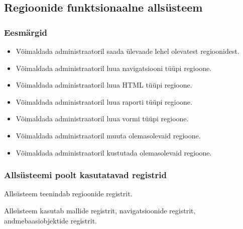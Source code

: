 \documentclass[a4paper,12pt]{article} %
\begin{document}
\subsection{Regioonide funktsionaalne allsüsteem}
\subsubsection{Eesmärgid}
\begin{itemize}
\item Võimaldada administraatoril saada ülevaade lehel olevatest regioonidest.
\item Võimaldada administraatoril luua navigatsiooni tüüpi regioone.
\item Võimaldada administraatoril luua HTML tüüpi regioone.
\item Võimaldada administraatoril luua raporti tüüpi regioone.
\item Võimaldada administraatoril luua vormi tüüpi regioone.
\item Võimaldada administraatoril muuta olemasolevaid regioone.
\item Võimaldada administraatoril kustutada olemasolevaid regioone.
\end{itemize}
\subsubsection{Allsüsteemi poolt kasutatavad registrid}
Allsüsteem teenindab regioonide registrit.\par
Allsüsteem kasutab mallide registrit, navigatsioonide registrit, andmebaasiobjektide registrit.
\end{document}
